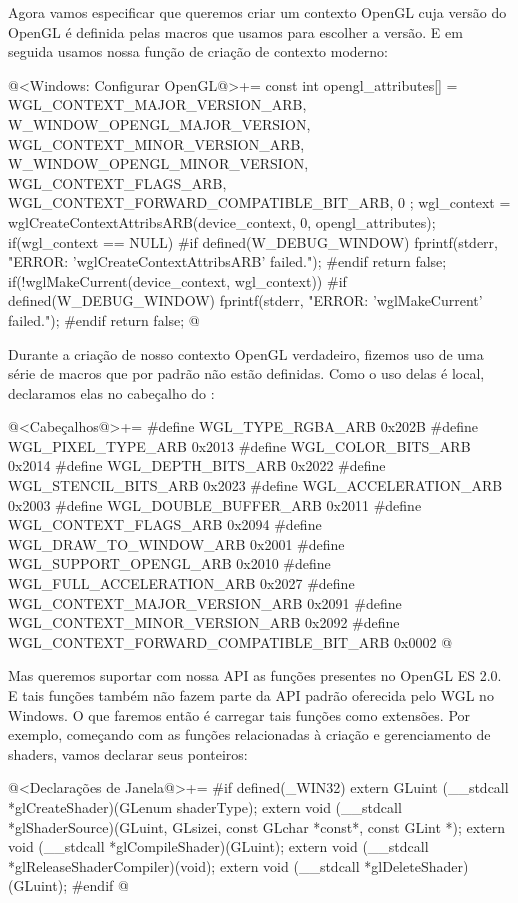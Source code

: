 Agora vamos especificar que queremos criar um contexto OpenGL cuja
versão do OpenGL é definida pelas macros que usamos para escolher a
versão. E em seguida usamos nossa função de criação de contexto
moderno:

\iniciocodigo
@<Windows: Configurar OpenGL@>+=
{
  const int opengl_attributes[] = {
    WGL_CONTEXT_MAJOR_VERSION_ARB, W_WINDOW_OPENGL_MAJOR_VERSION,
    WGL_CONTEXT_MINOR_VERSION_ARB, W_WINDOW_OPENGL_MINOR_VERSION,
    WGL_CONTEXT_FLAGS_ARB, WGL_CONTEXT_FORWARD_COMPATIBLE_BIT_ARB,
    0 };
  wgl_context = wglCreateContextAttribsARB(device_context, 0, opengl_attributes);
  if(wgl_context == NULL){
#if defined(W_DEBUG_WINDOW)
    fprintf(stderr, "ERROR: 'wglCreateContextAttribsARB' failed.\n");
#endif
    return false;
  }
  if(!wglMakeCurrent(device_context, wgl_context)){
#if defined(W_DEBUG_WINDOW)
    fprintf(stderr, "ERROR: 'wglMakeCurrent' failed.\n");
#endif
    return false;
  }
}
@
\fimcodigo

Durante a criação de nosso contexto OpenGL verdadeiro, fizemos uso de
uma série de macros que por padrão não estão definidas. Como o uso
delas é local, declaramos elas no cabeçalho do :

\iniciocodigo
@<Cabeçalhos@>+=
#define WGL_TYPE_RGBA_ARB                      0x202B
#define WGL_PIXEL_TYPE_ARB                     0x2013
#define WGL_COLOR_BITS_ARB                     0x2014
#define WGL_DEPTH_BITS_ARB                     0x2022
#define WGL_STENCIL_BITS_ARB                   0x2023
#define WGL_ACCELERATION_ARB                   0x2003
#define WGL_DOUBLE_BUFFER_ARB                  0x2011
#define WGL_CONTEXT_FLAGS_ARB                  0x2094
#define WGL_DRAW_TO_WINDOW_ARB                 0x2001
#define WGL_SUPPORT_OPENGL_ARB                 0x2010
#define WGL_FULL_ACCELERATION_ARB              0x2027
#define WGL_CONTEXT_MAJOR_VERSION_ARB          0x2091
#define WGL_CONTEXT_MINOR_VERSION_ARB          0x2092
#define WGL_CONTEXT_FORWARD_COMPATIBLE_BIT_ARB 0x0002
@
\fimcodigo

Mas queremos suportar com nossa API as funções presentes no OpenGL ES
2.0. E tais funções também não fazem parte da API padrão oferecida
pelo WGL no Windows. O que faremos então é carregar tais funções como
extensões. Por exemplo, começando com as funções relacionadas à
criação e gerenciamento de shaders, vamos declarar seus ponteiros:

\iniciocodigo
@<Declarações de Janela@>+=
#if defined(_WIN32)
extern GLuint (__stdcall *glCreateShader)(GLenum shaderType);
extern void (__stdcall *glShaderSource)(GLuint, GLsizei, const GLchar *const*,
                                        const GLint *);
extern void (__stdcall *glCompileShader)(GLuint);
extern void (__stdcall *glReleaseShaderCompiler)(void);
extern void (__stdcall *glDeleteShader)(GLuint);
#endif
@
\fimcodigo

